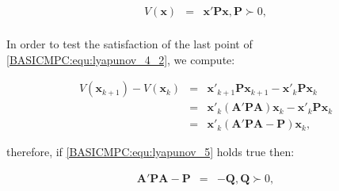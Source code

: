      \begin{equation}
        \begin{array}{rcl}
                V(\textbf{x})&=&\textbf{x}'\textbf{P}\textbf{x},\textbf{P}\succ 0,\\
            \end{array}
            \label{BASICMPC:equ:lyapunov_5}
        \end{equation}
    
    In order to test the satisfaction of the last point of \ref{BASICMPC:equ:lyapunov_4_2}, we compute:
    
    \begin{equation}
        \begin{array}{rcl}
                V(\textbf{x}_{k+1})-V(\textbf{x}_{k})&=&\textbf{x}'_{k+1}\textbf{P}\textbf{x}_{k+1}-\textbf{x}'_{k}\textbf{P}\textbf{x}_{k}\\
                &=&\textbf{x}'_{k}(\textbf{A}'\textbf{P}\textbf{A})\textbf{x}_{k}-\textbf{x}'_{k}\textbf{P}\textbf{x}_{k}\\
                &=&\textbf{x}'_{k}(\textbf{A}'\textbf{P}\textbf{A}-\textbf{P})\textbf{x}_{k},
            \end{array}
            \label{BASICMPC:equ:lyapunov_6}
        \end{equation}
    
    therefore, if \ref{BASICMPC:equ:lyapunov_5} holds true then:
    
    \begin{equation}
        \begin{array}{rcl}
                 \textbf{A}'\textbf{P}\textbf{A}-\textbf{P}&=&-\textbf{Q},\textbf{Q}\succ 0,\\
            \end{array}
            \label{BASICMPC:equ:lyapunov_7}
        \end{equation}

